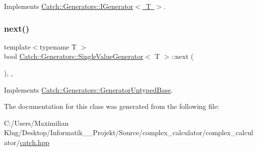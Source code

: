 Implements \mbox{\hyperlink{struct_catch_1_1_generators_1_1_i_generator_a525d381fc9249a885b075a0632a8579a}{Catch\+::\+Generators\+::\+I\+Generator$<$ T $>$}}.

\mbox{\label{class_catch_1_1_generators_1_1_single_value_generator_a10833b34e3ccbc484624185712eb8b6e}} 
\subsubsection{\texorpdfstring{next()}{next()}}
{\footnotesize\ttfamily template$<$typename T $>$ \\
bool \mbox{\hyperlink{class_catch_1_1_generators_1_1_single_value_generator}{Catch\+::\+Generators\+::\+Single\+Value\+Generator}}$<$ T $>$\+::next (\begin{DoxyParamCaption}{ }\end{DoxyParamCaption})\hspace{0.3cm}{\ttfamily [inline]}, {\ttfamily [override]}, {\ttfamily [virtual]}}



Implements \mbox{\hyperlink{class_catch_1_1_generators_1_1_generator_untyped_base_aeed3c0cd6233c5f553549e453b8d6638}{Catch\+::\+Generators\+::\+Generator\+Untyped\+Base}}.



The documentation for this class was generated from the following file\+:\begin{DoxyCompactItemize}
\item 
C\+:/\+Users/\+Maximilian Klug/\+Desktop/\+Informatik\+\_\+\_\+\+Projekt/\+Source/complex\+\_\+calculator/complex\+\_\+calculator/\mbox{\hyperlink{catch_8hpp}{catch.\+hpp}}\end{DoxyCompactItemize}
